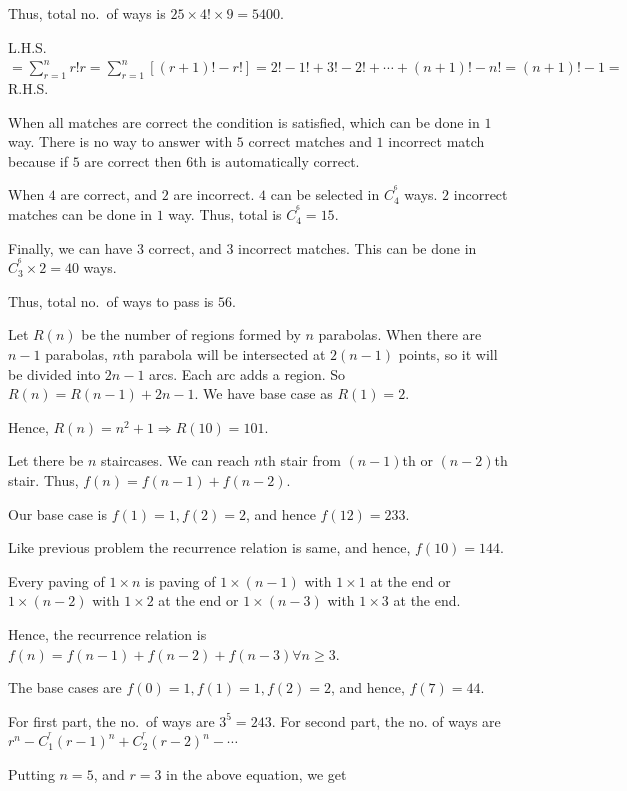   Thus, total no.\ of ways is $25\times4!\times 9 = 5400$.
\item L.H.S. $=\displaystyle\sum_{r = 1}^nr!r = \sum_{r = 1}^n[(r + 1)! - r!] = 2! - 1! + 3! - 2! + \cdots +
  (n + 1)! - n! = (n + 1)! - 1 =$ R.H.S.
\item When all matches are correct the condition is satisfied, which can be done in $1$ way. There is no way
  to answer with $5$ correct matches and $1$ incorrect match because if $5$ are correct then $6$th is
  automatically correct.

  When $4$ are correct, and $2$ are incorrect. $4$ can be selected in $C_4^^6$ ways. $2$ incorrect matches
  can be done in $1$ way. Thus, total is $C_4^^6 = 15$.

  Finally, we can have $3$ correct, and $3$ incorrect matches. This can be done in $C_3^^6\times2 = 40$
  ways.

  Thus, total no.\ of ways to pass is $56$.
\item Let $R(n)$ be the number of regions formed by $n$ parabolas. When there are $n - 1$ parabolas, $n$th
  parabola will be intersected at $2(n - 1)$ points, so it will be divided into $2n - 1$ arcs. Each arc adds
  a region. So $R(n) = R(n - 1) + 2n - 1$. We have base case as $R(1) = 2$.

  Hence, $R(n) = n^2 + 1 \Rightarrow R(10) = 101$.
\item Let there be $n$ staircases. We can reach $n$th stair from $(n - 1)$th or $(n - 2)$th stair. Thus,
  $f(n) = f(n - 1) + f(n - 2)$.

  Our base case is $f(1) = 1, f(2) = 2$, and hence $f(12) = 233$.
\item Like previous problem the recurrence relation is same, and hence, $f(10) = 144$.
\item Every paving of $1\times n$ is paving of $1\times(n - 1)$ with $1\times1$ at the end or $1\times(n -
  2)$ with $1\times2$ at the end or $1\times(n - 3)$ with $1\times3$ at the end.

  Hence, the recurrence relation is $f(n) = f(n - 1) + f(n - 2) + f(n - 3)\forall n\geq 3$.

  The base cases are $f(0) = 1, f(1) = 1, f(2) = 2$, and hence, $f(7) = 44$.
\item For first part, the no.\ of ways are $3^5 = 243$. For second part, the no. of ways are $r^n - C_1^^r(r
  - 1)^n + C_2^^r(r - 2)^n - \cdots $

  Putting $n = 5$, and $r = 3$ in the above equation, we get

